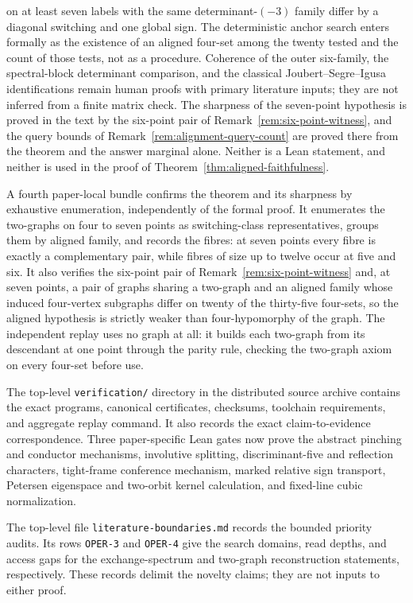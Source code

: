 on at least seven labels with the same determinant-\((-3)\) family differ by a
diagonal switching and one global sign.  The deterministic anchor search enters
formally as the existence of an aligned four-set among the twenty tested and the
count of those tests, not as a procedure.
Coherence of the outer six-family, the spectral-block determinant comparison,
and the classical
Joubert--Segre--Igusa identifications remain human proofs with primary
literature inputs; they are not inferred from a finite matrix check.
The sharpness of the seven-point hypothesis is proved in the text by the
six-point pair of Remark~\ref{rem:six-point-witness}, and the query bounds of
Remark~\ref{rem:alignment-query-count} are proved there from the theorem and
the answer marginal alone.  Neither is a Lean statement, and neither is used in
the proof of Theorem~\ref{thm:aligned-faithfulness}.

A fourth paper-local bundle confirms the theorem and its sharpness by
exhaustive enumeration, independently of the formal proof.  It enumerates the
two-graphs on four to seven points as switching-class representatives, groups
them by aligned family, and records the fibres: at seven points every fibre is
exactly a complementary pair, while fibres of size up to twelve occur at five
and six.  It also verifies the six-point pair of
Remark~\ref{rem:six-point-witness} and, at seven points, a pair of graphs
sharing a two-graph and an aligned family whose induced four-vertex subgraphs
differ on twenty of the thirty-five four-sets, so the aligned hypothesis is
strictly weaker than four-hypomorphy of the graph.  The independent replay uses
no graph at all: it builds each two-graph from its descendant at one point
through the parity rule, checking the two-graph axiom on every four-set before
use.

The top-level \texttt{verification/} directory in the distributed source
archive contains
the exact programs, canonical certificates, checksums, toolchain
requirements, and aggregate replay command.  It also records the exact
claim-to-evidence correspondence.  Three paper-specific Lean gates now prove the
abstract pinching and conductor mechanisms, involutive splitting,
discriminant-five and reflection characters, tight-frame conference mechanism,
marked relative sign transport, Petersen eigenspace and two-orbit kernel
calculation, and fixed-line cubic normalization.

The top-level file \texttt{literature-boundaries.md} records the bounded
priority audits.  Its rows \texttt{OPER-3} and \texttt{OPER-4} give the
search domains, read depths, and access gaps for the exchange-spectrum and
two-graph reconstruction statements, respectively.  These records delimit
the novelty claims; they are not inputs to either proof.


